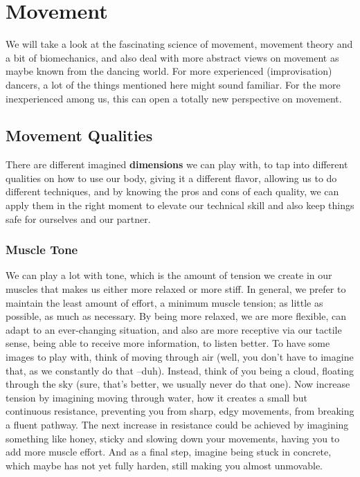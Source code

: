 \chapter{Movement}\label{ch:movement}


We will take a look at the fascinating science of movement, movement theory and a bit of biomechanics, and also deal with more abstract views on movement as maybe known from the dancing world.
For more experienced (improvisation) dancers, a lot of the things mentioned here might sound familiar.
For the more inexperienced among us, this can open a totally new perspective on movement.

\section{Movement Qualities}\label{sec:movement-qualities}

There are different imagined \textbf{dimensions} we can play with, to tap into different qualities on how to use our body, giving it a different flavor, allowing us to do different techniques, and by knowing the pros and cons of each quality, we can apply them in the right moment to elevate our technical skill and also keep things safe for ourselves and our partner.

\subsection{Muscle Tone}

We can play a lot with tone, which is the amount of tension we create in our muscles that makes us either more relaxed or more stiff.
In general, we prefer to maintain the least amount of effort, a minimum muscle tension; as little as possible, as much as necessary.
By being more relaxed, we are more flexible, can adapt to an ever-changing situation, and also are more receptive via our tactile sense, being able to receive more information, to listen better.
To have some images to play with, think of moving through air (well, you don't have to imagine that, as we constantly do that --duh).
Instead, think of you being a cloud, floating through the sky (sure, that's better, we usually never do that one).
Now increase tension by imagining moving through water, how it creates a small but continuous resistance, preventing you from sharp, edgy movements, from breaking a fluent pathway.
The next increase in resistance could be achieved by imagining something like honey, sticky and slowing down your movements, having you to add more muscle effort.
And as a final step, imagine being stuck in concrete, which maybe has not yet fully harden, still making you almost unmovable.

